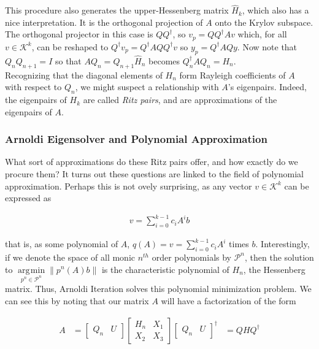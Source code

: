 \documentclass[11pt]{article}
\newcommand{\K}[1]{\mathcal{K}^{#1}}
\DeclareMathOperator*{\argmin}{\arg\!\min}
\begin{document}
This procedure also generates the upper-Hessenberg matrix $\hat{H}_k$, which also has a nice interpretation. It is the orthogonal projection of $A$ onto the Krylov subspace. The orthogonal projector in this case is $Q Q^\dagger$, so $v_p = Q Q^\dagger Av$ which, for all $v \in \K{k}$, can be reshaped to $Q^\dagger v_p = Q^\dagger A Q Q^\dagger v$ so $y_p = Q^\dagger A Q y$. Now note that $Q_n Q_{n+1} = I$ so that $A Q_n = Q_{n+1} \hat{H}_n$ becomes $Q_n^\dagger A Q_n = H_n$. \\

Recognizing that the diagonal elements of $H_n$ form Rayleigh coefficients of $A$ with respect to $Q_n$, we might suspect a relationship with $A$'s eigenpairs. Indeed, the eigenpairs of $H_k$ are called \textit{Ritz pairs}, and are approximations of the eigenpairs of $A$. 

\subsubsection{Arnoldi Eigensolver and Polynomial Approximation}

What sort of approximations do these Ritz pairs offer, and how exactly do we procure them? It turns out these questions are linked to the field of polynomial approximation. Perhaps this is not ovely surprising, as any vector $v \in \K{k}$ can be expressed as

\begin{align*}
  v = \sum \limits _{i=0}^{k-1} c_i A^i b
\end{align*}

that is, as some polynomial of $A$, $q(A) = v = \sum \limits _{i=0}^{k-1} c_i A^i$ times $b$. Interestingly, if we denote the space of all monic $n^{th}$ order polynomials by $\mathcal{P}^n$, then the solution to $\argmin \limits_{p^n \in \mathcal{P}^n} \| p^n(A)b \|$ is the characteristic polynomial of $H_n$, the Hessenberg matrix. Thus, Arnoldi Iteration solves this polynomial minimization problem. We can see this by  noting that our matrix $A$ will have a factorization of the form

\begin{align*}
  A &= \begin{bmatrix} Q_n & U \end{bmatrix} \begin{bmatrix} H_n & X_1 \\ X_2 & X_3 \end{bmatrix} \begin{bmatrix} Q_n & U \end{bmatrix}^\dagger
  &= Q H Q^\dagger
\end{align*}
\end{document}
